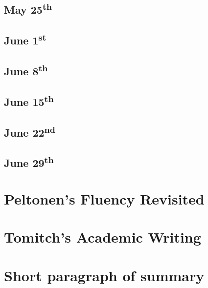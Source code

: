 \newpage
\section[May 25th]{May 25\textsuperscript{th}}
\label{app:may25}

\newpage
\section[June 1st]{June 1\textsuperscript{st}}
\label{app:jun01}

\newpage
\section[June 8th]{June 8\textsuperscript{th}}
\label{app:jun08}

\newpage
\section[June 15th]{June 15\textsuperscript{th}}
\label{app:jun15}

\newpage
\section[June 22nd]{June 22\textsuperscript{nd}}
\label{app:jun22}

\newpage
\section[June 29th]{June 29\textsuperscript{th}}
\label{app:jun29}

\chapter{Peltonen's Fluency Revisited}
\label{app:peltonen}

\chapter{Tomitch's Academic Writing}
\label{app:tomitch}

\chapter{Short paragraph of summary}
\label{app:summary}

